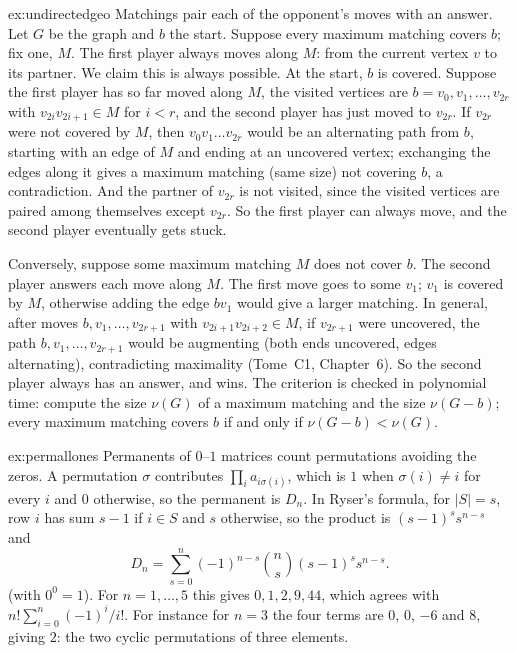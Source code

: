 \begin{solution}{ex:undirectedgeo}
\idea Matchings pair each of the opponent's moves with an answer.
\writeup Let $G$ be the graph and $b$ the start. Suppose every maximum matching covers $b$; fix one, $M$. The first player always moves along $M$: from the current vertex $v$ to its partner. We claim this is always possible. At the start, $b$ is covered. Suppose the first player has so far moved along $M$, the visited vertices are $b=v_0,v_1,\dots,v_{2r}$ with $v_{2i}v_{2i+1}\in M$ for $i<r$, and the second player has just moved to $v_{2r}$. If $v_{2r}$ were not covered by $M$, then $v_0v_1\dots v_{2r}$ would be an alternating path from $b$, starting with an edge of $M$ and ending at an uncovered vertex; exchanging the edges along it gives a maximum matching (same size) not covering $b$, a contradiction. And the partner of $v_{2r}$ is not visited, since the visited vertices are paired among themselves except $v_{2r}$. So the first player can always move, and the second player eventually gets stuck.

Conversely, suppose some maximum matching $M$ does not cover $b$. The second player answers each move along $M$. The first move goes to some $v_1$; $v_1$ is covered by $M$, otherwise adding the edge $bv_1$ would give a larger matching. In general, after moves $b,v_1,\dots,v_{2r+1}$ with $v_{2i+1}v_{2i+2}\in M$, if $v_{2r+1}$ were uncovered, the path $b,v_1,\dots,v_{2r+1}$ would be augmenting (both ends uncovered, edges alternating), contradicting maximality (Tome~C1, Chapter~6). So the second player always has an answer, and wins. The criterion is checked in polynomial time: compute the size $\nu(G)$ of a maximum matching and the size $\nu(G-b)$; every maximum matching covers $b$ if and only if $\nu(G-b)<\nu(G)$.
\end{solution}

\begin{solution}{ex:permallones}
\idea Permanents of $0$--$1$ matrices count permutations avoiding the zeros.
\writeup A permutation $\sigma$ contributes $\prod_ia_{i\sigma(i)}$, which is $1$ when $\sigma(i)\ne i$ for every $i$ and $0$ otherwise, so the permanent is $D_n$. In Ryser's formula, for $|S|=s$, row $i$ has sum $s-1$ if $i\in S$ and $s$ otherwise, so the product is $(s-1)^ss^{n-s}$ and
\[
D_n=\sum_{s=0}^n(-1)^{n-s}\binom ns(s-1)^ss^{n-s}.
\]
(with $0^0=1$). For $n=1,\dots,5$ this gives $0,1,2,9,44$, which agrees with $n!\sum_{i=0}^n(-1)^i/i!$. For instance for $n=3$ the four terms are $0$, $0$, $-6$ and $8$, giving $2$: the two cyclic permutations of three elements.
\end{solution}

